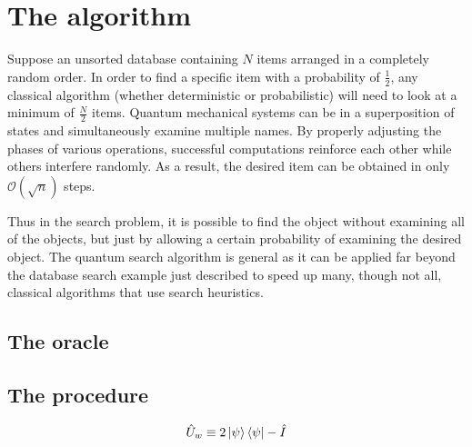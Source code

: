 \section{The algorithm}\label{sec:the-algorithm}
Suppose an unsorted database containing $N$ items arranged in a completely random order. In order to find a specific item with a probability of $\frac{1}{2}$, any classical algorithm (whether deterministic or probabilistic) will need to look at a minimum of $\frac{N}{2}$ items. Quantum mechanical systems can be in a superposition of states and simultaneously examine multiple names. By properly adjusting the phases of various operations, successful computations reinforce each other while others interfere randomly. As a result, the desired item can be obtained in only $\mathcal{O}(\sqrt{n})$ steps.

Thus in the search problem, it is possible to find the object without examining all of the objects, but just by allowing a certain probability of examining the desired object.
The quantum search algorithm is general as it can be applied far beyond the database search example just described to speed up many, though not all, classical algorithms that use search heuristics.
\subsection{The oracle}

\subsection{The procedure}
\begin{equation}
    \hat{U}_w \equiv 2 \ket{\psi}\bra{\psi} - \hat{I}
\end{equation}
